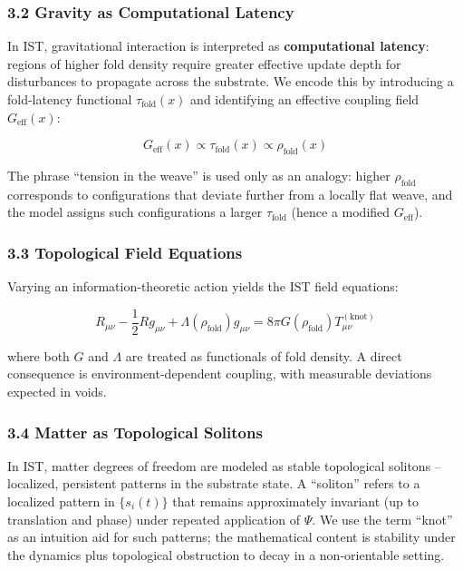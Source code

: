 \documentclass[
]{article}
\begin{document}
\subsubsection{3.2 Gravity as Computational
Latency}\label{gravity-as-computational-latency}

In IST, gravitational interaction is interpreted as
\textbf{computational latency}: regions of higher fold density require
greater effective update depth for disturbances to propagate across the
substrate. We encode this by introducing a fold-latency functional
\(\tau_{\text{fold}}(x)\) and identifying an effective coupling field
\(G_{\text{eff}}(x)\):

\[G_{\text{eff}}(x) \propto \tau_{\text{fold}}(x) \propto \rho_{\text{fold}}(x)\]

The phrase ``tension in the weave'' is used only as an analogy: higher
\(\rho_{\text{fold}}\) corresponds to configurations that deviate
further from a locally flat weave, and the model assigns such
configurations a larger \(\tau_{\text{fold}}\) (hence a modified
\(G_{\text{eff}}\)).

\subsubsection{3.3 Topological Field
Equations}\label{topological-field-equations}

Varying an information-theoretic action yields the IST field equations:

\[R_{\mu\nu} - \frac{1}{2} R g_{\mu\nu} + \Lambda(\rho_{\text{fold}}) g_{\mu\nu} = 8\pi G(\rho_{\text{fold}}) T^{(\text{knot})}_{\mu\nu}\]

where both \(G\) and \(\Lambda\) are treated as functionals of fold
density. A direct consequence is environment-dependent coupling, with
measurable deviations expected in voids.

\subsubsection{3.4 Matter as Topological
Solitons}\label{matter-as-topological-solitons}

In IST, matter degrees of freedom are modeled as stable topological
solitons -- localized, persistent patterns in the substrate state. A
``soliton'' refers to a localized pattern in \(\{s_i(t)\}\) that remains
approximately invariant (up to translation and phase) under repeated
application of \(\Psi\). We use the term ``knot'' as an intuition aid
for such patterns; the mathematical content is stability under the
dynamics plus topological obstruction to decay in a non-orientable
setting.
\end{document}
